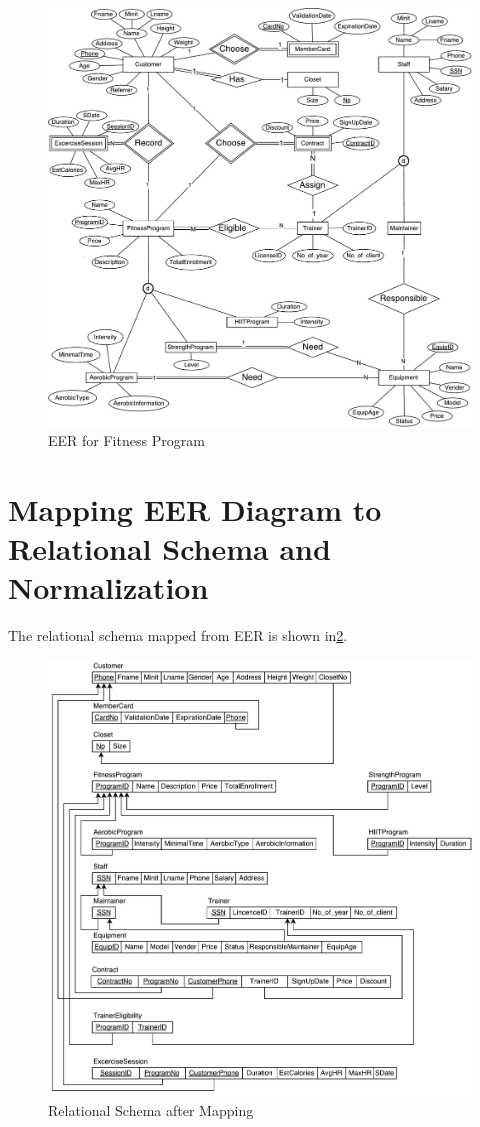 \documentclass[12pt,letterpaper,titlepage,en-US]{article}
\begin{document}
\begin{figure}[H]
    \caption{EER for Fitness Program}\label{eer}
    \centering
    \includegraphics[width=\textwidth]{img/eer}
\end{figure}

\pagebreak
\section{Mapping EER Diagram to Relational Schema and Normalization}
The relational schema mapped from EER is shown in\cref{sdam}.

\begin{figure}[H]
    \caption{Relational Schema after Mapping}\label{sdam}
    \centering
    \includegraphics[width=\textwidth]{img/sdam}
\end{figure}
\end{document}
